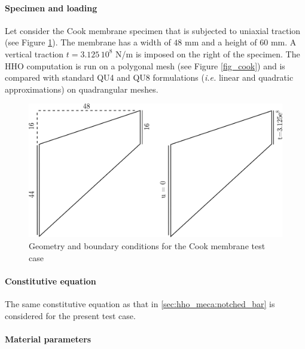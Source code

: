 \paragraph{Specimen and loading}

Let consider the Cook membrane specimen that is subjected to uniaxial
traction (see Figure \ref{fig_cook_mesh}). The membrane has a width of $48$ mm and a height of $60$ mm.
A vertical traction $t = 3.125 \, 10^{8}$ N/m is imposed on the right of the specimen.
The HHO computation is run on a polygonal mesh (see Figure \ref{fig_cook}) and
is compared with standard QU4 and QU8 formulations (\textit{i.e.} linear
and quadratic approximations) on quadrangular meshes.

\begin{figure}[H]
    \centering
    \includegraphics[width=12.cm]{../chapter_002_hho_mechanics/drawings/cook_mesh.png}
    \caption{Geometry and boundary conditions for the Cook membrane test case}
    \label{fig_cook_mesh}
\end{figure}

\paragraph{Constitutive equation}

The same constitutive equation as that in \ref{sec:hho_meca:notched_bar} is
considered for the present test case.

\paragraph{Material parameters}

